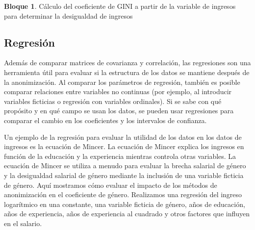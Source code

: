 \documentclass[]{book}
\newenvironment{Shaded}{\begin{snugshade}}{\end{snugshade}}
\newcommand{\CommentTok}[1]{\textcolor[rgb]{0.56,0.35,0.01}{\textit{#1}}}
\newcommand{\DataTypeTok}[1]{\textcolor[rgb]{0.13,0.29,0.53}{#1}}
\newcommand{\KeywordTok}[1]{\textcolor[rgb]{0.13,0.29,0.53}{\textbf{#1}}}
\newcommand{\NormalTok}[1]{#1}
\newcommand{\OperatorTok}[1]{\textcolor[rgb]{0.81,0.36,0.00}{\textbf{#1}}}
\newcommand{\OtherTok}[1]{\textcolor[rgb]{0.56,0.35,0.01}{#1}}
\newcommand{\StringTok}[1]{\textcolor[rgb]{0.31,0.60,0.02}{#1}}
\theoremstyle{definition}
\theoremstyle{definition}
\newtheorem{example}{Bloque}[chapter]
\theoremstyle{definition}
\theoremstyle{definition}
\theoremstyle{remark}
\begin{document}
\begin{example}
\protect\hypertarget{exm:bloque9lbn}{}{\label{exm:bloque9lbn} }Cálculo del coeficiente de GINI a partir de la variable de ingresos para determinar la desigualdad de ingresos
\end{example}

\begin{Shaded}
\end{Shaded}

\hypertarget{regresiuxf3n}{%
\subsection{Regresión}\label{regresiuxf3n}}

Además de comparar matrices de covarianza y correlación, las regresiones son una herramienta útil para evaluar si la estructura de los datos se mantiene después de la anonimización. Al comparar los parámetros de regresión, también es posible comparar relaciones entre variables no continuas (por ejemplo, al introducir variables ficticias o regresión con variables ordinales). Si se sabe con qué propósito y en qué campo se usan los datos, se pueden usar regresiones para comparar el cambio en los coeficientes y los intervalos de confianza.

Un ejemplo de la regresión para evaluar la utilidad de los datos en los datos de ingresos es la ecuación de Mincer. La ecuación de Mincer explica los ingresos en función de la educación y la experiencia mientras controla otras variables. La ecuación de Mincer se utiliza a menudo para evaluar la brecha salarial de género y la desigualdad salarial de género mediante la inclusión de una variable ficticia de género. Aquí mostramos cómo evaluar el impacto de los métodos de anonimización en el coeficiente de género. Realizamos una regresión del
ingreso logarítmico en una constante, una variable ficticia de género, años de educación, años de experiencia, años de experiencia al cuadrado y otros factores que influyen en el salario.
\end{document}
